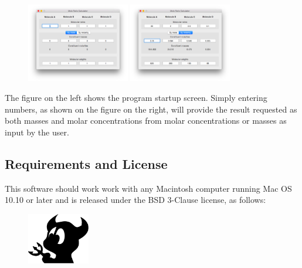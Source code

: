\documentclass[a4paper]{article}
\begin{document}
		\begin{figure}[ht!]
			\centering
			\includegraphics[width=0.4\textwidth]{Graphics/ScreenOne} \includegraphics[width=0.4\textwidth]{Graphics/ScreenTwo}
		\end{figure}

		\noindent The figure on the left shows the program startup screen. Simply entering numbers, as shown on the figure on the right, will provide the result requested as both masses and molar concentrations from molar concentrations or masses as input by the user.

		\clearpage


	\begin{centering}
 		\section*{Requirements and License}
 		\label{sec:requirements_and_license}
	\end{centering} 
		
			\noindent This software should work work with any Macintosh computer running Mac OS 10.10 or later and is released under the BSD 3-Clause license, as follows:

			\begin{figure}[ht!]
				\centering
				\includegraphics[height=6em]{Graphics/BSD}
			\end{figure}
\end{document}
